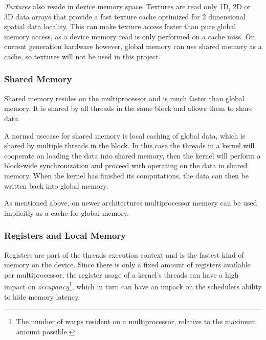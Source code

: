 
\textit{Textures} also reside in device memory space. Textures are read only 1D,
2D or 3D data arrays that provide a fast texture cache optimized for 2
dimensional spatial data locality. This can make texture access faster than pure
global memory access, as a device memory read is only performed on a cache
miss. On current generation hardware however, global memory can use shared
memory as a cache, so textures will not be used in this project.

\subsubsection{Shared Memory}


Shared memory resides on the multiprocessor and is much faster than global
memory. It is shared by all threads in the same block and allows them to share
data.


A normal usecase for shared memory is local caching of global data, which is
shared by multiple threads in the block. In this case the threads in a kernel
will cooperate on loading the data into shared memory, then the kernel will
perform a block-wide synchronization and proceed with operating on the data in
shared memory. When the kernel has finished its computations, the data can then
be written back into global memory.


As mentioned above, on newer architectures multiprocessor memory can be used
implicitly as a cache for global memory.




\subsubsection{Registers and Local Memory}


Registers are part of the threads execution context and is the fastest kind of
memory on the device. Since there is only a fixed amount of registers available
per multiprocessor, the register usage of a kernel's threads can have a high
impact on \textit{occupancy}\footnote{The number of warps resident on a
  multiprocessor, relative to the maximum amount possible.}, which in turn can
have an impack on the schedulers ability to hide memory latency.

